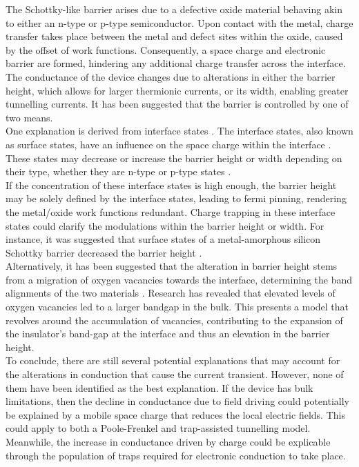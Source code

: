 \noindent The Schottky-like barrier arises due to a defective oxide material behaving akin to either an n-type \cite{fujii2005hysteretic} or p-type \cite{sawa2004hysteretic} semiconductor. Upon contact with the metal, charge transfer takes place between the metal and defect sites within the oxide, caused by the offset of work functions. Consequently, a space charge and electronic barrier are formed, hindering any additional charge transfer across the interface. The conductance of the device changes due to alterations in either the barrier height, which allows for larger thermionic currents, or its width, enabling greater tunnelling currents. It has been suggested that the barrier is controlled by one of two means.\\

\noindent One explanation is derived from interface states \cite{seong2007hpha}. The interface states, also known as surface states, have an influence on the space charge within the interface \cite{bardeen1947surface}. These states may decrease or increase the barrier height or width depending on their type, whether they are n-type or p-type states \cite{cowley1965surface}. \\

\noindent If the concentration of these interface states is high enough, the barrier height may be solely defined by the interface states, leading to fermi pinning, rendering the metal/oxide work functions redundant. Charge trapping in these interface states could clarify the modulations within the barrier height or width. For instance, it was suggested that surface states of a metal-amorphous silicon Schottky barrier decreased the barrier height \cite{wronski1977surface}.\\

\noindent Alternatively, it has been suggested that the alteration in barrier height stems from a migration of oxygen vacancies towards the interface, determining the band alignments of the two materials \cite{asanuma2009relationship}. Research has revealed that elevated levels of oxygen vacancies led to a larger bandgap in the bulk. This presents a model that revolves around the accumulation of vacancies, contributing to the expansion of the insulator's band-gap at the interface and thus an elevation in the barrier height.\\

\noindent To conclude, there are still several potential explanations that may account for the alterations in conduction that cause the current transient. However, none of them have been identified as the best explanation. If the device has bulk limitations, then the decline in conductance due to field driving could potentially be explained by a mobile space charge that reduces the local electric fields. This could apply to both a Poole-Frenkel and trap-assisted tunnelling model. Meanwhile, the increase in conductance driven by charge could be explicable through the population of traps required for electronic conduction to take place.\\

